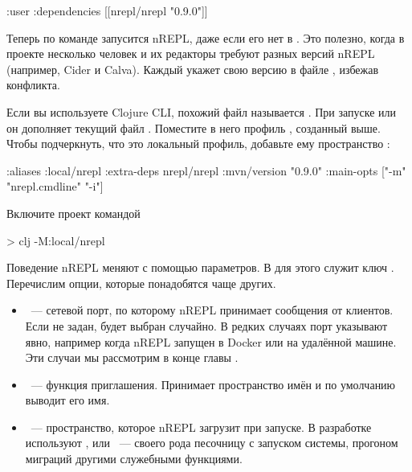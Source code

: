 \begin{english}
  \begin{clojure}
{:user
  {:dependencies
    [[nrepl/nrepl "0.9.0"]]}}
  \end{clojure}
\end{english}

Теперь по команде  запусится nREPL, даже если его нет в . Это полезно, когда в проекте несколько человек и их редакторы требуют разных версий nREPL (например, Cider и Calva). Каждый укажет свою версию в файле , избежав конфликта.

Если вы используете Clojure CLI, похожий файл называется . При запуске  или  он дополняет текущий файл . Поместите в него профиль , созданный выше. Чтобы подчеркнуть, что это локальный профиль, добавьте ему пространство :

\begin{english}
  \begin{clojure}
{:aliases
 {:local/nrepl
  {:extra-deps {nrepl/nrepl {:mvn/version "0.9.0"}}
   :main-opts ["-m" "nrepl.cmdline" "-i"]}}}
  \end{clojure}
\end{english}

Включите проект командой

\begin{english}
  \begin{bash}
> clj -M:local/nrepl
  \end{bash}
\end{english}

Поведение nREPL меняют с помощью параметров. В  для этого служит ключ . Перечислим опции, которые понадобятся чаще других.

\begin{itemize}

\item
  ~--- сетевой порт, по которому nREPL принимает сообщения от клиентов. Если не задан, будет выбран случайно. В редких случаях порт указывают явно, например когда nREPL запущен в Docker или на удалённой машине. Эти случаи мы рассмотрим в конце главы .

\item
  ~--- функция приглашения. Принимает пространство имён и по умолчанию выводит его имя.

\item
  ~--- пространство, которое nREPL загрузит при запуске. В разработке используют ,  или ~--- своего рода песочницу с запуском системы, прогоном миграций другими служебными функциями.

\end{itemize}

